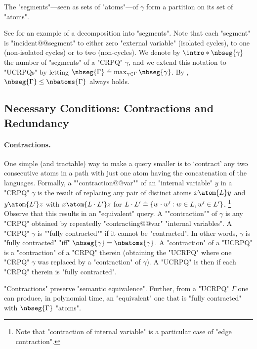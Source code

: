\begin{fact}
	\AP\label{fact:partition-into-segments}
	The "segments"---seen as sets of "atoms"---of $\gamma$ form a partition on its set of "atoms".
\end{fact}

See  for an example of a decomposition into "segments".
Note that each "segment" is "incident@@segment" to either zero "external variable" (isolated cycles),
to one (non-isolated cycles) or to two (non-cycles).
We denote by \AP$\intro*\nbseg{\gamma}$ the number of "segments" of a "CRPQ" $\gamma$,
and we extend this notation to "UCRPQs" by letting $\nbseg{\Gamma} \defeq
\max_{\gamma \in \Gamma}{\nbseg{\gamma}}$. By , $\nbseg{\Gamma}\leq \nbatoms{\Gamma}$ always holds.

\subsection{Necessary Conditions: Contractions and Redundancy}

\paragraph{Contractions.}
One simple (and tractable) way to make a query smaller is to `contract' any two consecutive atoms in a path with just one atom having the concatenation of the languages.
Formally, a \AP""contraction@@var"" of an "internal variable" $y$ in a "CRPQ" $\gamma$ is the result of replacing any pair of distinct atoms $x \atom{L} y$ and $y \atom{L'} z$ with $x \atom{L \cdot L'} z$ for $L \cdot L' \mathrel{\hat{=}} \{w \cdot w' : w \in L, w' \in L'\}$.%
\footnote{Note that "contraction of internal variable" is a particular case of "edge contraction".} Observe that this results in an "equivalent" query.
A \AP""contraction"" of $\gamma$ is any "CRPQ" obtained by repeatedly "contracting@@var" "internal variables".
A "CRPQ" $\gamma$ is \AP""fully contracted"" if it cannot be "contracted".
In other words, $\gamma$ is "fully contracted" "iff" $\nbseg{\gamma} = \nbatoms{\gamma}$.
A "contraction" of a "UCRPQ" is a "contraction" of a "CRPQ" therein (obtaining the "UCRPQ" where one "CRPQ" $\gamma$ was replaced by a "contraction" of $\gamma$). A "UCRPQ" is then  if each "CRPQ" therein is "fully contracted".

\begin{fact}
	\AP\label{fact:produce-fully-contracted}
	"Contractions" preserve "semantic equivalence". Further, from a "UCRPQ" $\Gamma$ one can produce, in polynomial time, an "equivalent" one that is "fully contracted" with $\nbseg{\Gamma}$ "atoms".
\end{fact}

